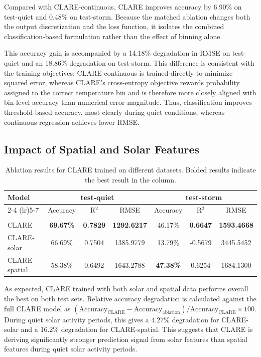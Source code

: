 \documentclass{agujournal2019}
\begin{document}
Compared with CLARE-continuous, CLARE improves accuracy by 6.90\% on test-quiet and 0.48\% on test-storm. Because the matched ablation changes both the output discretization and the loss function, it isolates the combined classification-based formulation rather than the effect of binning alone.

This accuracy gain is accompanied by a 14.18\% degradation in RMSE on test-quiet and an 18.86\% degradation on test-storm. This difference is consistent with the training objectives: CLARE-continuous is trained directly to minimize squared error, whereas CLARE's cross-entropy objective rewards probability assigned to the correct temperature bin and is therefore more closely aligned with bin-level accuracy than numerical error magnitude. Thus, classification improves threshold-based accuracy, most clearly during quiet conditions, whereas continuous regression achieves lower RMSE.

\subsection{Impact of Spatial and Solar Features}
\label{results:impact_of_input_features}

\begin{table}[htbp]
    \centering
    \caption{Ablation results for CLARE trained on different datasets. Bolded results indicate the best result in the column.}
    \begin{tabular}{lcccccc}
        \toprule
        \multirow{2}{*}{Model} & \multicolumn{3}{c}{test-quiet} & \multicolumn{3}{c}{test-storm} \\
        \cmidrule(lr){2-4} \cmidrule(lr){5-7}
        & Accuracy & R$^2$ & RMSE  & Accuracy & R$^2$ & RMSE \\
        \midrule
        \\[-0.8em]
        CLARE & \textbf{69.67\%} & \textbf{0.7829} & \textbf{1292.6217} & 46.17\% & \textbf{0.6647} & \textbf{1593.4668} \\[0.5em]
        CLARE-solar & 66.69\% & 0.7504 & 1385.9779 & 13.79\% & -0.5679 & 3445.5452 \\[0.5em]
        CLARE-spatial & 58.38\% & 0.6492 & 1643.2788  & \textbf{47.38\%} & 0.6254 & 1684.1300 \\[0.5em]
        \bottomrule
    \end{tabular}
    \label{tab:dataset_ablation}
\end{table}

As expected, CLARE trained with both solar and spatial data performs overall the best on both test sets. Relative accuracy degradation is calculated against the full CLARE model as $(\mathrm{Accuracy}_{\mathrm{CLARE}}-\mathrm{Accuracy}_{\mathrm{ablation}})/\mathrm{Accuracy}_{\mathrm{CLARE}} \times 100$. During quiet solar activity periods, this gives a 4.27\% degradation for CLARE-solar and a 16.2\% degradation for CLARE-spatial. This suggests that CLARE is deriving significantly stronger prediction signal from solar features than spatial features during quiet solar activity periods.
\end{document}
